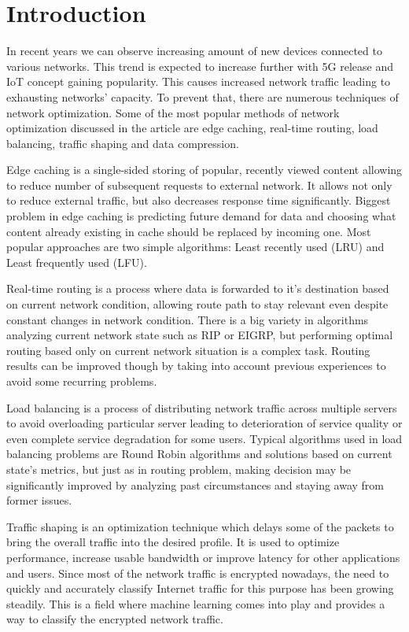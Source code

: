 \documentclass[conference]{IEEEtran}
\begin{document}
\section{Introduction}
In recent years we can observe increasing amount of new devices connected to various networks. This trend is expected to increase further with 5G release and IoT concept gaining popularity. This causes increased network traffic leading to exhausting networks' capacity. To prevent that, there are numerous techniques of network optimization. Some of the most popular methods of network optimization discussed in the article are edge caching, real-time routing, load balancing, traffic shaping and data compression.\par
Edge caching is a single-sided storing of popular, recently viewed content allowing to reduce number of subsequent requests to external network. It allows not only to reduce external traffic, but also decreases response time significantly. Biggest problem in edge caching is predicting future demand for data and choosing what content already existing in cache should be replaced by incoming one. Most popular approaches are two simple algorithms: Least recently used (LRU) and Least frequently used (LFU)\cite{cache1}\cite{cache2}.\par
Real-time routing is a process where data is forwarded to it's destination based on current network condition, allowing route path to stay relevant even despite constant changes in network condition. There is a big variety in algorithms analyzing current network state such as RIP or EIGRP, but performing optimal routing based only on current network situation is a complex task. Routing results can be improved though by taking into account previous experiences to avoid some recurring problems\cite{routing1}\cite{routing2}.\par
Load balancing is a process of distributing network traffic across multiple servers to avoid overloading particular server leading to deterioration of service quality or even complete service degradation for some users. Typical algorithms used in load balancing problems are Round Robin algorithms and solutions based on current state's metrics, but just as in routing problem, making decision may be significantly improved by analyzing past circumstances and staying away from former issues\cite{balancing1}\cite{balancing2}.\par
Traffic shaping is an optimization technique which delays some of the packets to bring the overall traffic into the desired profile. It is used to optimize performance, increase usable bandwidth or improve latency for other applications and users. Since most of the network traffic is encrypted nowadays, the need to quickly and accurately classify Internet traffic for this purpose has been growing steadily\cite{shaping1}. This is a field where machine learning comes into play and provides a way to classify the encrypted network traffic.\par
\end{document}
